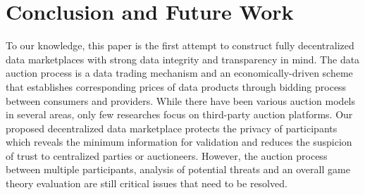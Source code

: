 \documentclass[journal,10pt,a4paper]{IEEEtran}
\begin{document}
\section{\normalsize\textbf{Conclusion and Future Work}}
To our knowledge, this paper is the first attempt to construct fully decentralized data marketplaces with strong data integrity and transparency in mind.
The data auction process is a data trading mechanism and an economically-driven scheme that establishes corresponding prices of data products through bidding process between consumers and providers. While there have been various auction models\cite{BigPicDataMarket} in several areas, only few researches focus on third-party auction platforms. Our proposed decentralized data marketplace protects the privacy of participants which reveals the minimum information for validation and reduces the suspicion of trust to centralized parties or auctioneers. However, the auction process between multiple participants, analysis of potential threats and an overall game theory evaluation are still critical issues that need to be resolved.




\end{document}
